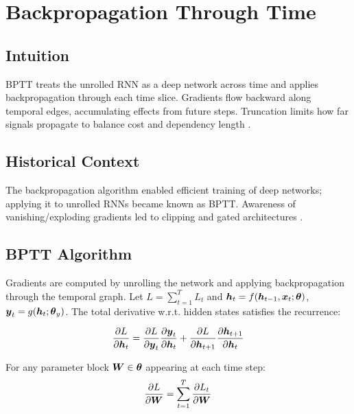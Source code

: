 
\section{Backpropagation Through Time }
\label{sec:bptt}

\subsection*{Intuition}

BPTT treats the unrolled RNN as a deep network across time and applies backpropagation through each time slice. Gradients flow backward along temporal edges, accumulating effects from future steps. Truncation limits how far signals propagate to balance cost and dependency length \cite{GoodfellowEtAl2016}.

\subsection*{Historical Context}

The backpropagation algorithm \cite{Rumelhart1986} enabled efficient training of deep networks; applying it to unrolled RNNs became known as BPTT. Awareness of vanishing/exploding gradients led to clipping and gated architectures \cite{GoodfellowEtAl2016,Hochreiter1997}.


\subsection{BPTT Algorithm}

Gradients are computed by unrolling the network and applying backpropagation through the temporal graph. Let $L=\sum_{t=1}^{T} L_t$ and $\boldsymbol{h}_t = f(\boldsymbol{h}_{t-1}, \boldsymbol{x}_t; \boldsymbol{\theta})$, $\boldsymbol{y}_t = g(\boldsymbol{h}_t; \boldsymbol{\theta}_y)$. The total derivative w.r.t. hidden states satisfies the recurrence:

\begin{equation}
\frac{\partial L}{\partial \boldsymbol{h}_t} = \frac{\partial L}{\partial \boldsymbol{y}_t} \frac{\partial \boldsymbol{y}_t}{\partial \boldsymbol{h}_t} + \frac{\partial L}{\partial \boldsymbol{h}_{t+1}} \frac{\partial \boldsymbol{h}_{t+1}}{\partial \boldsymbol{h}_t}
\end{equation}

For any parameter block $\boldsymbol{W} \in \boldsymbol{\theta}$ appearing at each time step:
\begin{equation}
\frac{\partial L}{\partial \boldsymbol{W}} = \sum_{t=1}^{T} \frac{\partial L_t}{\partial \boldsymbol{W}}
\end{equation}

